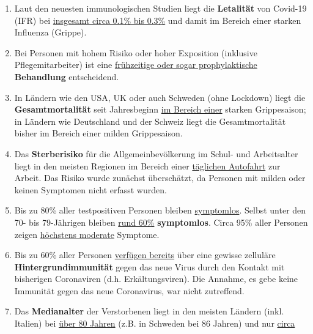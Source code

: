 \begin{enumerate}
\def\labelenumi{\arabic{enumi}.}
\tightlist
\item
  Laut den neuesten immunologischen Studien liegt die \textbf{Letalität}
  von Covid-19 (IFR) bei
  \href{https://swprs.org/studies-on-covid-19-lethality/}{insgesamt
  circa 0.1\% bis 0.3\%} und damit im Bereich einer starken Influenza
  (Grippe).
\item
  Bei Personen mit hohem Risiko oder hoher Exposition (inklusive
  Pflegemitarbeiter) ist eine
  \href{https://swprs.org/zur-behandlung-von-covid-19/}{frühzeitige oder
  sogar prophylaktische} \textbf{Behandlung} entscheidend.
\item
  In Ländern wie den USA, UK oder auch Schweden (ohne Lockdown) liegt
  die \textbf{Gesamt­mortalität} seit Jahresbeginn
  \href{https://swprs.org/studies-on-covid-19-lethality/\#overall-mortality}{im
  Bereich einer} starken Grippesaison; in Ländern wie Deutschland und
  der Schweiz liegt die Gesamtmortalität bisher im Bereich einer milden
  Grippesaison.
\item
  Das \textbf{Sterberisiko} für die Allgemeinbevölkerung im Schul- und
  Arbeitsalter liegt in den meisten Regionen im Bereich einer
  \href{https://www.medrxiv.org/content/10.1101/2020.04.05.20054361v1}{täglichen
  Autofahrt} zur Arbeit. Das Risiko wurde zunächst überschätzt, da
  Personen mit milden oder keinen Symptomen nicht erfasst wurden.
\item
  Bis zu 80\% aller testpositiven Personen bleiben
  \href{https://www.bmj.com/content/369/bmj.m1375}{symptomlos}. Selbst
  unter den 70- bis 79-Jährigen bleiben
  \href{https://www.niid.go.jp/niid/en/2019-ncov-e/9407-covid-dp-fe-01.html}{rund
  60\%} \textbf{symptomlos}. Circa 95\% aller Personen zeigen
  \href{https://swprs.org/studies-on-covid-19-lethality/\#hospitalizations}{höchstens
  moderate} Symptome.
\item
  Bis zu 60\% aller Personen
  \href{https://www.cell.com/cell/fulltext/S0092-8674(20)30610-3}{verfügen
  bereits} über eine gewisse zelluläre \textbf{Hinter­grund­immunität}
  gegen das neue Virus durch den Kontakt mit bisherigen Coronaviren
  (d.h. Erkältungsviren). Die Annahme, es gebe keine Immunität gegen das
  neue Coronavirus, war nicht zutreffend.
\item
  Das \textbf{Medianalter} der Verstorbenen liegt in den meisten Ländern
  (inkl. Italien) bei
  \href{https://swprs.org/studies-on-covid-19-lethality/\#age}{über 80
  Jahren} (z.B. in Schweden bei 86 Jahren) und nur
  \href{https://www.bloomberg.com/news/articles/2020-05-26/italy-says-96-of-virus-fatalities-suffered-from-other-illnesses}{circa
}
\end{enumerate}
